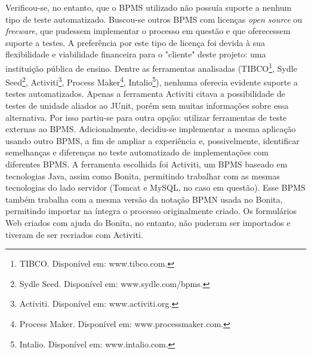 \documentclass[12pt]{article}
\begin{document}
Verificou-se, no entanto, que o BPMS utilizado não possuía suporte a nenhum tipo de teste automatizado. Buscou-se outros BPMS com licenças \emph{open source} ou \emph{freeware}, que pudessem implementar o processo em questão e que oferecessem suporte a testes. A preferência por este tipo de licença foi devida à sua flexibilidade e viabilidade financeira para o "cliente" deste projeto: uma instituição pública de ensino.
Dentre as ferramentas analisadas (TIBCO\footnote{TIBCO. Disponível em: www.tibco.com.}, Sydle Seed\footnote{Sydle Seed. Disponível em: www.sydle.com/bpms.}, Activiti\footnote{Activiti. Disponível em: www.activiti.org.}, Process Maker\footnote{Process Maker. Disponível em: www.processmaker.com.}, Intalio\footnote{Intalio. Disponível em: www.intalio.com.}), nenhuma oferecia evidente suporte a testes automatizados. Apenas a ferramenta Activiti citava a possibilidade de testes de unidade aliados ao JUnit, porém sem muitas informações sobre essa alternativa. Por isso partiu-se para outra opção: utilizar ferramentas de teste externas ao BPMS. Adicionalmente, decidiu-se implementar a mesma aplicação usando outro BPMS, a fim de ampliar a experiência e, possivelmente, identificar semelhanças e diferenças no teste automatizado de implementações com diferentes BPMS.
A ferramenta escolhida foi Activiti, um BPMS baseado em tecnologias Java, assim como Bonita, permitindo trabalhar com as mesmas tecnologias do lado servidor (Tomcat e MySQL, no caso em questão). Esse BPMS também trabalha com a mesma versão da notação BPMN usada no Bonita, permitindo importar na íntegra o processo originalmente criado. Os formulários Web criados com ajuda do Bonita, no entanto, não puderam ser importados e tiveram de ser recriados com Activiti.






\end{document}
